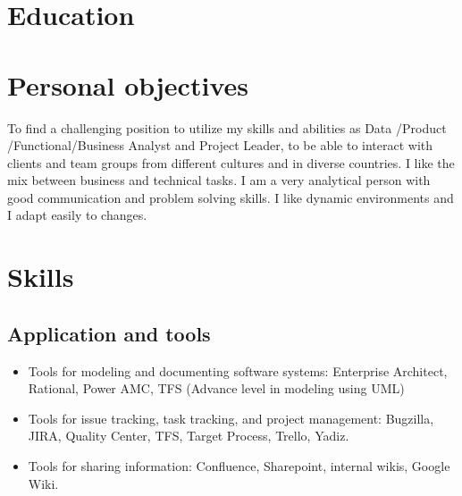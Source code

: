 \documentclass[11pt,a4paper,sans]{moderncv}
\begin{document}
\makecvtitle

\section{Education}


\section{Personal objectives}

To find a challenging position to utilize my skills and abilities as Data /Product /Functional/Business Analyst
and Project Leader, to be able to interact with clients and team groups from different cultures and in diverse countries. I like the mix between business and technical tasks.
I am a very analytical person with good communication and problem solving skills. 
I like dynamic environments and I adapt easily to changes.

\section{Skills}





\subsection{Application and tools}

\begin{itemize}
  \item Tools for modeling and documenting software systems: Enterprise Architect, Rational, Power AMC, TFS (Advance level in modeling using UML)
  \item Tools for issue tracking, task tracking, and project management: Bugzilla, JIRA, Quality Center, TFS, Target Process, Trello, Yadiz.
  \item Tools for sharing information: Confluence, Sharepoint, internal wikis, Google Wiki.

\end{itemize}
\end{document}
